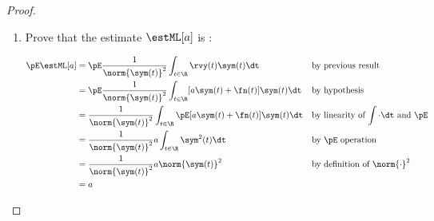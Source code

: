 \begin{proposition}
\begin{proof}
\begin{enumerate}
\item Prove that the estimate $\estML[a]$ is :

\begin{align*}
   \pE\estML[a]
     &= \pE\frac{1}{\norm{\sym(t)}^2} \int_{t\in\R} \rvy(t)\sym(t) \dt
     && \text{by previous result}
   \\&= \pE\frac{1}{\norm{\sym(t)}^2} \int_{t\in\R} [ a \sym(t)+\fn(t)]\sym(t) \dt
     && \text{by hypothesis}
   \\&= \frac{1}{\norm{\sym(t)}^2} \int_{t\in\R} \pE[ a \sym(t)+\fn(t)]\sym(t) \dt
     && \text{by linearity of $\int\cdot\dt$ and $\pE$}
   \\&= \frac{1}{\norm{\sym(t)}^2}  a  \int_{t\in\R} \sym^2(t) \dt
     && \text{by $\pE$ operation}
   \\&= \frac{1}{\norm{\sym(t)}^2}  a  \norm{\sym(t)}^2
     && \text{by definition of $\norm{\cdot}^2$}
   \\&=   a
\end{align*}


\end{enumerate}
\end{proof}
\end{proposition}
